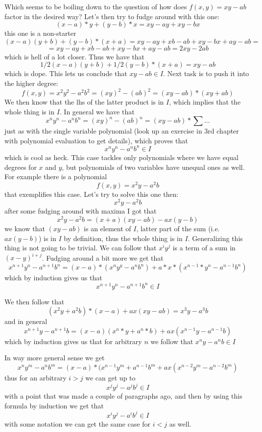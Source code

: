 \documentclass[11pt,oneside,titlepage]{book}
\begin{document}
Which seems to be boiling down to the question of how does $f(x, y) =
xy - ab$ factor in the desired way? Let's then try to fudge around
with this one:
$$(x - a) * y + (y - b) * x = xy - ay + xy - bx $$
this one is a non-starter
$$(x - a)(y + b) + (y - b) * (x + a) = xy - ay + xb - ab + xy - bx + ay - ab =$$
$$= 
xy - ay + xb - ab + xy - bx + ay - ab = 2xy - 2ab$$ which is hell of a
lot closer. Thus we have that
$$1/2(x - a)(y + b) + 1/2(y - b) * (x + a) = xy - ab$$
which is dope. This lets us conclude that $xy - ab \in I$.  Next task
is to push it into the higher degree:
$$f(x, y) = x^2y^2 - a^2 b^2 = (xy)^2 - (ab)^2 = (xy - ab) * (xy + ab)$$
We then know that the lhs of the latter product is in $I$, which
implies that the whole thing is in $I$. In general we have that
$$x^ny^n - a^n b^n = (xy)^n - (ab)^n = (xy - ab) * \sum{...}$$
just as with the single variable polynomial (look up an exercise in
3rd chapter with polynomial evaluation to get details), which proves
that
$$x^ny^n - a^n b^n \in I$$
which is cool as heck. This case tackles only polynomials where we
have equal degrees for $x$ and $y$, but polynomials of two variables
have unequal ones as well. For example there is a polynomial
$$f(x, y) = x^2y - a^2b$$
that exemplifies this case. Let's try to solve this one then:
$$x^2y - a^2b$$
after some fudging around with maxima I got that
$$x^2y - a^2b = (x + a) (xy - ab) - ax (y - b)$$
we know that $(xy - ab)$ is an element of $I$, latter part of the sum
(i.e. $ax (y - b)$) is in $I$ by definition, thus the whole thing is
in $I$. Generalizing this thing is not going to be trivial. We can
follow that $x^i y^j$ is a term of a sum in $(x - y)^{i + j}$.
Fudging around a bit more we get that
$$x^{n + 1}y^n - a^{n + 1}b^n =
(x - a) * (x^n y^y - a^n b^n) + a * x * (x^{n - 1} * y^n - a^{n -
1}b^n)$$ which by induction gives us that
$$x^{n + 1}y^n - a^{n + 1}b^n \in I$$

We then follow that
$$(x^2y + a^2b) * (x - a) + a x(xy - ab) = x^3 y - a^3 b$$
and in general
$$x^{n + 1}y - a^{n + 1}b =
(x - a)(x^n * y + a^n * b) + ax(x^{n - 1}y - a^{n - 1}b)$$ which by
induction gives us that for arbitrary $n$ we follow that $x^{n}y -
a^{n}b \in I$

In way more general sense we get
$$x^ny^m - a^nb^m =
(x - a) * (x^{n - 1} y^m + a^{n - 1}b^m + ax(x^{n - 2}y^m - a^{n -
2}b^m)$$ thus for an arbitrary $i > j$ we can get up to
$$x^j y^j - a^j b^j \in I$$
with a point that was made a couple of paragraphs ago, and then by
using this formula by induction we get that
$$x^i y^j - a^i b^j \in I$$
with some notation we can get the same case for $i < j$ as well.
\end{document}
